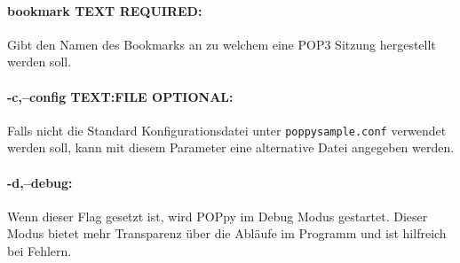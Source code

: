 \documentclass[12pt]{article}
\def\code#1{\texttt{#1}}
\begin{document}
\paragraph{bookmark TEXT REQUIRED:}
Gibt den Namen des Bookmarks an zu welchem eine POP3 Sitzung hergestellt werden 
soll.

\paragraph{-c,--config TEXT:FILE OPTIONAL:}
Falls nicht die Standard Konfigurationsdatei unter 
\code{poppy\textunderscore sample.conf} verwendet werden soll, kann mit diesem
Parameter eine alternative Datei angegeben werden.

\paragraph{-d,--debug:}
Wenn dieser Flag gesetzt ist, wird POPpy im Debug Modus gestartet. Dieser Modus
bietet mehr Transparenz über die Abläufe im Programm und ist hilfreich bei
Fehlern.
\end{document}
